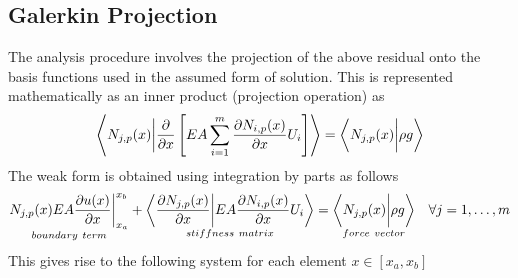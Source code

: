 \documentclass[submit,12pt]{aiaa-pretty} %
\begin{document}
\subsection{Galerkin Projection}
The analysis procedure involves the projection of the above residual
onto the basis functions used in the assumed form of solution. This is
represented mathematically as an inner product (projection operation) as
\begin{equation}\nonumber
  \left\langle  {\color{black}{N_{j,p}(x)}} \bigg\vert {\color{black}{\dfrac{\partial }{\partial x} \left[ EA \sum_{i=1}^{m} \dfrac{\partial N_{i,p}(x)}{\partial x}  U_i  \right]}} \right\rangle  =
  \left\langle  {\color{black}{N_{j,p}(x)}} \bigg\vert {\color{black}{\rho g}} \right\rangle 
\end{equation}
The weak form is obtained using integration by parts as follows
\begin{equation}\nonumber
  \begin{gathered}
    \underset{boundary~term}{{{N_{j,p}(x) EA \dfrac{\partial u(x)}{\partial x}}}  \bigg\vert_{x_a}^{x_b}} +  \underset{stiffness~matrix}{\left\langle {\color{black}{\dfrac{\partial N_{j,p}(x)}{\partial x}}}  \bigg\vert  {\color{black}{EA  \dfrac{\partial N_{i,p}(x)}{\partial x}  U_i}}   \right\rangle}  = 
    \underset{force~vector}{\left\langle {\color{black}{N_{j,p}(x)}} \bigg\vert {\color{black}{\rho g}} \right\rangle} \quad \forall j = 1, \ldots,m
  \end{gathered}
\end{equation}
This gives rise to the following system for each element $x \in [x_a,
  x_b]$
\end{document}
